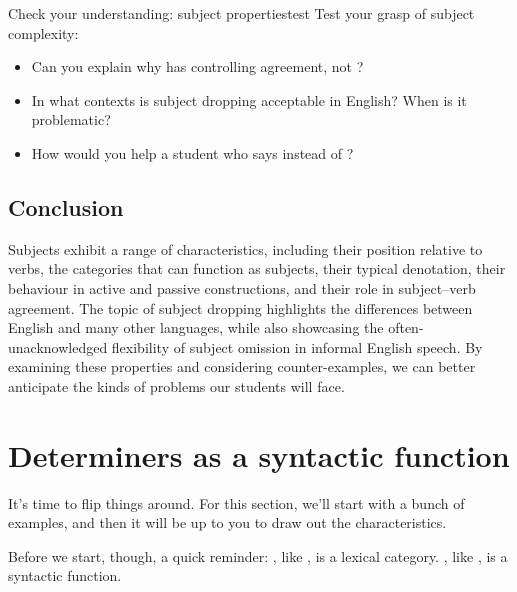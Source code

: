 \begin{tblsframedsymbol}{Check your understanding: subject properties}{test}
Test your grasp of subject complexity:
\begin{itemize}[noitemsep, leftmargin=*]
    \item Can you explain why  has  controlling agreement, not ?
    \item In what contexts is subject dropping acceptable in English? When is it problematic?
    \item How would you help a student who says  instead of ?
\end{itemize}
\end{tblsframedsymbol}

\subsection{Conclusion}
Subjects exhibit a range of characteristics, including their position relative to verbs, the categories that can function as subjects, their typical denotation, their behaviour in active and passive constructions, and their role in subject--verb agreement. The topic of subject dropping highlights the differences between English and many other languages, while also showcasing the often-unacknowledged flexibility of subject omission in informal English speech. By examining these properties and considering counter-examples, we can better anticipate the kinds of problems our students will face.

\section{Determiners as a syntactic function}
It's time to flip things around. For this section, we'll start with a bunch of examples, and then it will be up to you to draw out the characteristics.

Before we start, though, a quick reminder: , like , is a lexical category. , like , is a syntactic function.

